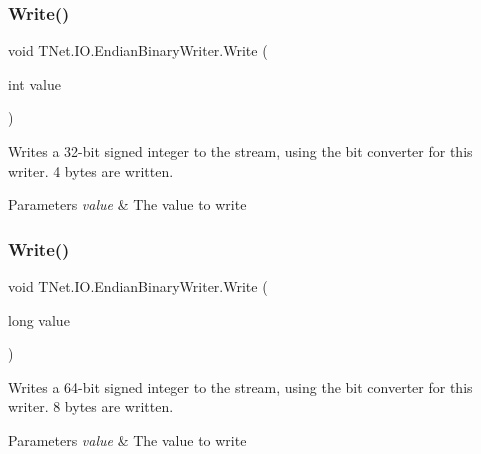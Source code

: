 \subsubsection{\texorpdfstring{Write()}{Write()}\hspace{0.1cm}{\footnotesize\ttfamily [3/17]}}
{\footnotesize\ttfamily void T\+Net.\+I\+O.\+Endian\+Binary\+Writer.\+Write (\begin{DoxyParamCaption}\item[{int}]{value }\end{DoxyParamCaption})}



Writes a 32-\/bit signed integer to the stream, using the bit converter for this writer. 4 bytes are written. 


\begin{DoxyParams}{Parameters}
{\em value} & The value to write\\
\hline
\end{DoxyParams}
\mbox{\label{class_t_net_1_1_i_o_1_1_endian_binary_writer_ac00e25e106c3d5d83b9ae0b615304325}} 
\subsubsection{\texorpdfstring{Write()}{Write()}\hspace{0.1cm}{\footnotesize\ttfamily [4/17]}}
{\footnotesize\ttfamily void T\+Net.\+I\+O.\+Endian\+Binary\+Writer.\+Write (\begin{DoxyParamCaption}\item[{long}]{value }\end{DoxyParamCaption})}



Writes a 64-\/bit signed integer to the stream, using the bit converter for this writer. 8 bytes are written. 


\begin{DoxyParams}{Parameters}
{\em value} & The value to write\\
\hline
\end{DoxyParams}
\mbox{\label{class_t_net_1_1_i_o_1_1_endian_binary_writer_a5df654e5cc0a63088b5a38c1f63c81ba}} 
